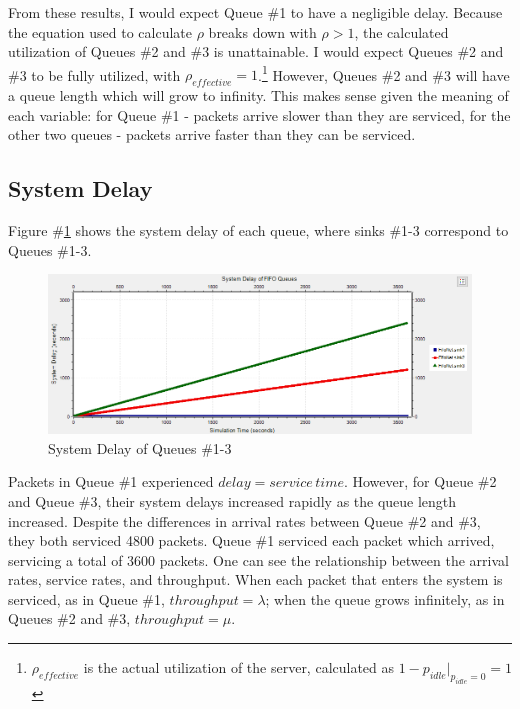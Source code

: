 \documentclass{article}
\begin{document}
From these results, I would expect Queue \#1 to have a negligible delay.  
Because the equation used to calculate $\rho$ breaks down with $\rho > 1$, the calculated utilization of Queues \#2 and \#3 is unattainable.  
I would expect Queues \#2 and \#3 to be fully utilized, with $\rho_{effective} = 1$.\footnote{$\rho_{effective}$ is the actual utilization of the server, calculated as $1-p_{idle}|_{p_{idle}=0}=1$}
However, Queues \#2 and \#3 will have a queue length which will grow to infinity.
This makes sense given the meaning of each variable:  for Queue \#1 - packets arrive slower than they are serviced, for the other two queues - packets arrive faster than they can be serviced.

\subsection*{System Delay}
Figure \#\ref{DelayPlot} shows the system delay of each queue, where sinks \#1-3 correspond to Queues \#1-3.

\begin{figure}[h!]
	\begin{center}
	\includegraphics[scale=0.65]{Images/DelayPlot.PNG}
	\vspace{-.25cm}
	\caption{System Delay of Queues \#1-3}
	\label{DelayPlot}
	\end{center}
\end{figure}

Packets in Queue \#1 experienced $delay = service \, time$.  
However, for Queue \#2 and Queue \#3, their system delays increased rapidly as the queue length increased.  
Despite the differences in arrival rates between Queue \#2 and \#3, they both serviced 4800 packets.  
Queue \#1 serviced each packet which arrived, servicing a total of 3600 packets.
One can see the relationship between the arrival rates, service rates, and throughput.
When each packet that enters the system is serviced, as in Queue \#1, $throughput = \lambda$; when the queue grows infinitely, as in Queues \#2 and \#3, $throughput = \mu$.
\end{document}
